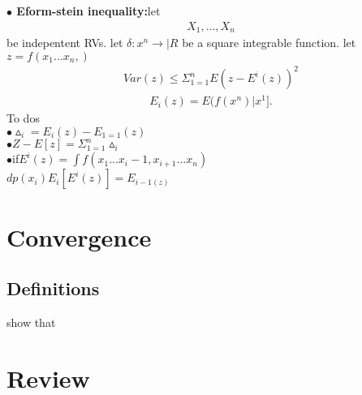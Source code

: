 \documentclass[journal,12pt,twocolumn]{IEEEtran}
\begin{document}
\textbf{$\bullet$ Eform-stein inequality:}let
\begin{align}
X_1, \dots, X_n
\end{align}
be indepentent RVs. let $\delta:x^n\rightarrow |R$ be a square integrable function. let $z=f(x_1...x_n,)$\\
\begin{align}
Var(z)\leqslant \Sigma_{1=1}^{n} E(z-E^i(z))^2
\end{align}
\begin{align}
E_i(z)=E(f(x^n)|x^1].
\end{align}
To dos\\
$\bullet \vartriangle_i=E_i(z)-E_{1=1}(z)$\\

$\bullet Z-E[z]= \Sigma_{1=1}^{n} \vartriangle_i$\\

$\bullet$if$E^i(z)= \int f(x_1...x_i-1,x_{i+1}...x_n)$\\

 $dp(x_i) E_i[E^i(z)]=E_{i-1(z)}$\\

\section{Convergence}
\subsection{Definitions}
show that\\
\section{Review}
\end{document}
